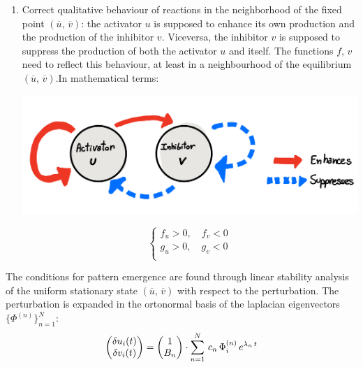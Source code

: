 \begin{enumerate}
	\item Correct qualitative behaviour of reactions in the neighborhood of the fixed point $(\overline{u},\, \overline{v})$: the activator $u$ is supposed to enhance its own production and the production of the inhibitor $v$. Viceversa, the inhibitor $v$ is supposed to suppress the production of both the activator $u$ and itself. The functions $f,\, v$ need to reflect this behaviour, at least in a neighbourhood of the equilibrium $(\overline{u},\, \overline{v})$.In mathematical terms:
    \newline
        \begin{minipage}{0.48\textwidth}
    \centering
	\includegraphics[width=\textwidth]{images/turing/diagram.jpeg}
 \label{fig:diagram}
    \end{minipage}
    \hfill
    \begin{minipage}{0.4\textwidth}
    \centering
    \begin{equation}
           \begin{cases}
         f_u > 0,\quad f_v < 0 \\
         g_u >0,\quad  g_v <0 \\      
        \end{cases} 
        \label{eq:basic_2}
        \end{equation}
    \end{minipage}
\end{enumerate}
The conditions for pattern emergence are found through linear stability analysis of the uniform stationary state $(\overline{u},\,\overline{v})$ with respect to the perturbation. The perturbation is expanded in the ortonormal basis of the laplacian eigenvectors $\{\Phi^{(n)}\}_{n=1}^{N}$:
\begin{equation*}
    \begin{pmatrix}
    \delta u_i (t) \\
    \delta v_i (t) \\
    \end{pmatrix}
    =
    \begin{pmatrix}
        1 \\
        B_n \\
    \end{pmatrix}
    \cdot \sum_{n=1}^{N}\, c_n\,\Phi_i^{(n)}\, e^{\lambda_n\,t} \\
\end{equation*}
